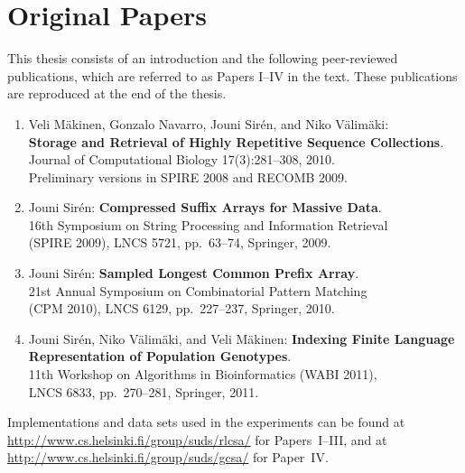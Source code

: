 \documentclass[officiallayout]{tktla}
\theoremstyle{definition}
\theoremstyle{remark}
\begin{document}
\chapter*{Original Papers}

This thesis consists of an introduction and the following peer-reviewed publications, which are referred to as Papers I--IV in the text. These publications are reproduced at the end of the thesis.

\renewcommand{\theenumi}{\Roman{enumi}.}
\renewcommand{\labelenumi}{\theenumi}

\begin{enumerate}

\item
Veli Mäkinen, Gonzalo Navarro, Jouni Sirén, and Niko Välimäki: \\
\textbf{Storage and Retrieval of Highly Repetitive Sequence Collections}. \\
Journal of Computational Biology 17(3):281--308, 2010. \\
Preliminary versions in SPIRE 2008 and RECOMB 2009.

\item
Jouni Sirén:
\textbf{Compressed Suffix Arrays for Massive Data}. \\
16th Symposium on String Processing and Information Retrieval \\
(SPIRE 2009),
LNCS 5721, pp.~63--74, Springer, 2009.

\item
Jouni Sirén:
\textbf{Sampled Longest Common Prefix Array}. \\
21st Annual Symposium on Combinatorial Pattern Matching \\
(CPM 2010),
LNCS 6129, pp.~227--237, Springer, 2010.

\item
Jouni Sirén, Niko Välimäki, and Veli Mäkinen:
\textbf{Indexing Finite Language Representation of Population Genotypes}. \\
11th Workshop on Algorithms in Bioinformatics (WABI 2011), \\
LNCS 6833, pp.~270--281, Springer, 2011.

\end{enumerate}

Implementations and data sets used in the experiments can be found at \url{http://www.cs.helsinki.fi/group/suds/rlcsa/} for Papers~I\nobreakdash--III, and at \url{http://www.cs.helsinki.fi/group/suds/gcsa/} for Paper~IV.

\renewcommand{\theenumi}{\arabic{enumi}.}
\renewcommand{\labelenumi}{\theenumi}

\tableofcontents


\mainmatter






















\end{document}
